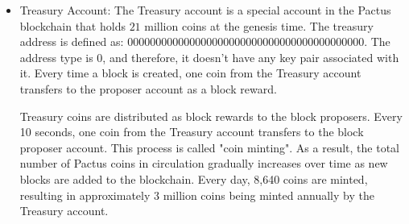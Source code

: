\documentclass{novel}
\begin{document}
%
%
\begin{itemize}
  \item
    Treasury Account: The Treasury account is a special account in the Pactus blockchain that holds $21$ million coins at the genesis time. The treasury address is defined as: 000000000000000000000000000000000000000000. The address type is 0, and therefore, it doesn’t have any key pair associated with it. Every time a block is created, one coin from the Treasury account transfers to the proposer account as a block reward.

    Treasury coins are distributed as block rewards to the block proposers. Every 10 seconds, one coin from the Treasury account transfers to the block proposer account. This process is called "coin minting". As a result, the total number of Pactus coins in circulation gradually increases over time as new blocks are added to the blockchain. Every day, 8,640 coins are minted, resulting in approximately 3 million coins being minted annually by the Treasury account.


\end{itemize}
\end{document}

